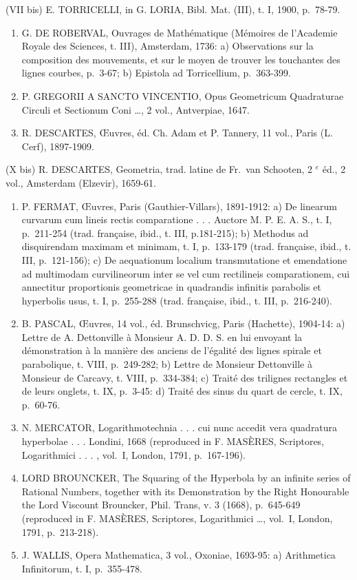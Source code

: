 (VII bis) E. TORRICELLI, in G. LORIA, Bibl. Mat. (III), t. I, 1900, p.~78-79.

\begin{enumerate}
\def\labelenumi{(\Roman{enumi})}
\setcounter{enumi}{7}
\item
  G. DE ROBERVAL, Ouvrages de Mathématique (Mémoires de l'Academie Royale des Sciences, t. III), Amsterdam, 1736: a) Observations sur la composition des mouvements, et sur le moyen de trouver les touchantes des lignes courbes, p.~3-67; b) Epistola ad Torricellium, p.~363-399.
\item
  P. GREGORII A SANCTO VINCENTIO, Opus Geometricum Quadraturae Circuli et Sectionum Coni \ldots, 2 vol., Antverpiae, 1647.
\item
  R. DESCARTES, Œuvres, éd. Ch. Adam et P. Tannery, 11 vol., Paris (L. Cerf), 1897-1909.
\end{enumerate}

(X bis) R. DESCARTES, Geometria, trad. latine de Fr.~van Schooten, 2 \(^{e}\) éd., 2 vol., Amsterdam (Elzevir), 1659-61.

\begin{enumerate}
\def\labelenumi{(\Roman{enumi})}
\setcounter{enumi}{10}
\item
  P. FERMAT, Œuvres, Paris (Gauthier-Villars), 1891-1912: a) De linearum curvarum cum lineis rectis comparatione . . . Auctore M. P. E. A. S., t. I, p.~211-254 (trad. française, ibid., t. III, p.181-215); b) Methodus ad disquirendam maximam et minimam, t. I, p.~133-179 (trad. française, ibid., t. III, p.~121-156); c) De aequationum localium transmutatione et emendatione ad multimodam curvilineorum inter se vel cum rectilineis comparationem, cui annectitur proportionis geometricae in quadrandis infinitis parabolis et hyperbolis usus, t. I, p.~255-288 (trad. française, ibid., t. III, p.~216-240).
\item
  B. PASCAL, Œuvres, 14 vol., éd. Brunschvicg, Paris (Hachette), 1904-14: a) Lettre de A. Dettonville à Monsieur A. D. D. S. en lui envoyant la démonstration à la manière des anciens de l'égalité des lignes spirale et parabolique, t. VIII, p.~249-282; b) Lettre de Monsieur Dettonville à Monsieur de Carcavy, t. VIII, p.~334-384; c) Traité des trilignes rectangles et de leurs onglets, t. IX, p.~3-45: d) Traité des sinus du quart de cercle, t. IX, p.~60-76.
\item
  N. MERCATOR, Logarithmotechnia . . . cui nunc accedit vera quadratura hyperbolae . . . Londini, 1668 (reproduced in F. MASÈRES, Scriptores, Logarithmici . . . , vol.~I, London, 1791, p.~167-196).
\item
  LORD BROUNCKER, The Squaring of the Hyperbola by an infinite series of Rational Numbers, together with its Demonstration by the Right Honourable the Lord Viscount Brouncker, Phil. Trans, v. 3 (1668), p.~645-649 (reproduced in F. MASÈRES, Scriptores, Logarithmici \ldots, vol.~I, London, 1791, p.~213-218).
\item
  J. WALLIS, Opera Mathematica, 3 vol., Oxoniae, 1693-95: a) Arithmetica Infinitorum, t. I, p.~355-478.
\end{enumerate}

